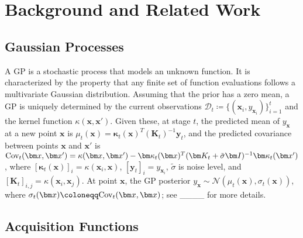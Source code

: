 \section{Background and Related Work}
\label{sec:related-work}
\subsection{Gaussian Processes}
A \ac{GP} is a stochastic process that models an unknown function. 
It is characterized by the property that any finite set of function evaluations follows a multivariate Gaussian distribution. 
Assuming that the prior has a zero mean, a \ac{GP} is uniquely determined by the current observations $\mathcal{D}_t\coloneqq\{(\bm x_i, y_{\bm x_i})\}_{i=1}^t$ and the kernel function $\kappa(\bm x, \bm x')$. 
Given these, at stage $t$, the predicted mean of $y_{\bm{x}}$ at a new point $\bm x$ is $\mu_t(\bm x) = \bm\kappa_t(\bm x)^T (\bm K_t)^{-1} \bm y_t$, and the predicted covariance between points $\bm x$ and $\bm x'$ is $\textup{Cov}_t(\bm x, \bm x') = \kappa(\bm x, \bm x') - \bm\kappa_t(\bm x)^T (\bm K_t+\tilde{\sigma}\bm I)^{-1} \bm\kappa_t(\bm x')$,
where $[\bm\kappa_t(\bm x)]_i = \kappa(\bm x_i, \bm x)$, $[\bm y_t]_i = y_{\bm x_i}$, $\tilde{\sigma}$ is noise level, and $[\bm K_t]_{i, j} = \kappa(\bm x_i, \bm x_j)$. At point $\bm x$, the \ac{GP} posterior $y_{\bm x}\sim\mathcal{N}(\mu_t(\bm x), \sigma_t(\bm x))$, where $\sigma_t(\bm x)\coloneqq \textup{Cov}_t(\bm x, \bm x)$; see ____ for more details. 


\subsection{Acquisition Functions}
